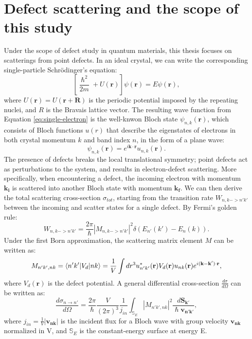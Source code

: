 \section{Defect scattering and the scope of this study}\label{sec:scopeofstudy}
Under the scope of defect study in quantum materials, this thesis focuses on scatterings from point defects. In an ideal crystal, we can write the corresponding single-particle Schr\"{o}dinger's equation: 
\begin{equation}
	\label{eq:single-electron}
	\left[\frac{\hslash^2}{2m}+U(\mathbf{r})\right]\psi(\mathbf{r}) = E\psi(\mathbf{r}),
\end{equation}
where $U(\mathbf{r})=U(\mathbf{r}+\mathbf{R})$ is the periodic potential imposed by the repeating nuclei, and $R$ is the Bravais lattice vector. 
The resulting wave function from Equation \ref{eq:single-electron} is the well-knwon Bloch state $\psi_{n,k}(\mathbf{r})$, which consists of Bloch functions $u(r)$ that describe the eigenstates of electrons in both crystal momentum $k$ and band index $n$, in the form of a plane wave: 
\begin{equation}
	\psi_{n,k}(\mathbf{r}) = e^{i\mathbf{k}\cdot \mathbf{r}}u_{n,k}(\mathbf{r}).
\end{equation}
The presence of defects breaks the local translational symmetry; point defects act as perturbations to the system, and results in electron-defect scattering. More specifically, when encountering a defect, the incoming electron with momentum $\mathbf{k_i}$ is scattered into another Bloch state with momentum $\mathbf{k_f}$. We can then derive the total scattering cross-section $\sigma_{tot}$, starting from the transition rate $W_{n,k->n'k'}$ between the incoming and scatter states for a single defect. By Fermi's golden rule:
\begin{equation}
	W_{n,k->n'k'} = \frac{2\pi}{\hslash}|M_{n,k->n'k'}|^2\delta(E_{n'}(k')-E_{n}(k)). 
\end{equation}
Under the first Born approximation, the scattering matrix element $M$ can be written as:  
\begin{equation}
	M_{n'k',nk} = \braket{n'k'|V_d|nk} = \frac{1}{V}\int dr^3 \space u_{n'k'}^{*}(\mathbf{r}) V_d(\mathbf{r}) u_{nk}(\mathbf{r})e^{i(\mathbf{k}-\mathbf{k'})\cdot \mathbf{r}},
\end{equation} 
where $V_d(\mathbf{r})$ is the defect potential. A general differential cross-section $\frac{d\sigma}{d\Omega}$ can be written as: 
\begin{equation}
	\label{eq:differential_cross_section}
	\frac{d\sigma_{n\rightarrow n'}}{d\Omega} = \frac{2\pi}{\hslash} \frac{V}{(2\pi)^3}\frac{1}{j_{in}}\int_{\mathbb{S}_E}|M_{n'k',nk}|^2\frac{d\mathbf{S_{k'}}}{\hslash \mathbf{v_{n'k'}}},
\end{equation}
where $j_{in} = \frac{1}{V}|\mathbf{v_{nk}}|$ is the incident flux for a Bloch wave with group velocity $\mathbf{v_{nk}}$ normalized in V, and $\mathbb{S}_E$ is the constant-energy surface at energy E. 

